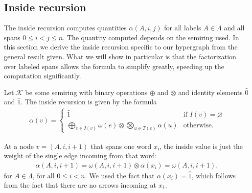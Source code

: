 \subsection{Inside recursion}
  The inside recursion computes quantities $\alpha(A,i,j)$ for all labels $A \in \Lambda$ and all spans $0 \leq i < j \leq n$. The quantity computed depends on the semiring used. In this section we derive the inside recursion specific to our hypergraph from the general result given. What we will show in particular is that the factorization over labeled spans allows the formula to simplify greatly, speeding up the computation significantly.

  Let $\mathcal{K}$ be some semiring with binary operations $\oplus$ and $\otimes$ and identity elements $\hat{0}$ and $\hat{1}$. The inside recursion is given by the formula \citep{goodman1999semiring}
  \begin{align*}
    \alpha(v) =
      \begin{cases}
        \hat{1}  &  \mbox{if } I(v) = \varnothing  \\
        \displaystyle\bigoplus_{e \in I(v)} \omega(e) \otimes \displaystyle\bigotimes_{u \in T(e)} \alpha(u)  & \mbox{otherwise.}
      \end{cases}
  \end{align*}

  At a node $v = (A, i, i+1)$ that spans one word $x_i$, the inside value is just the weight of the single edge incoming from that word:
  \begin{align}
      \label{eq:inside-base}
      \alpha(A, i, i+1) = \omega(A, i, i+1) \otimes \alpha(x_i) = \omega(A, i, i+1),
  \end{align}
  for $A \in \Lambda$, for all $0 \leq i < n$. We used the fact that $\alpha(x_i) = \hat{1}$, which follows from the fact that there are no arrows incoming at $x_i$.

